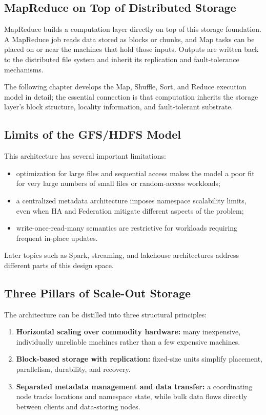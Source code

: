\documentclass[11pt,a4paper,oneside]{book}
\begin{document}
\subsection{MapReduce on Top of Distributed Storage}

MapReduce builds a computation layer directly on top of this storage foundation. A MapReduce job reads data stored as blocks or chunks, and Map tasks can be placed on or near the machines that hold those inputs. Outputs are written back to the distributed file system and inherit its replication and fault-tolerance mechanisms.

The following chapter develops the Map, Shuffle, Sort, and Reduce execution model in detail; the essential connection is that computation inherits the storage layer's block structure, locality information, and fault-tolerant substrate.

\subsection{Limits of the GFS/HDFS Model}

This architecture has several important limitations:

\begin{itemize}
    \item optimization for large files and sequential access makes the model a poor fit for very large numbers of small files or random-access workloads;
    \item a centralized metadata architecture imposes namespace scalability limits, even when HA and Federation mitigate different aspects of the problem;
    \item write-once-read-many semantics are restrictive for workloads requiring frequent in-place updates.
\end{itemize}

Later topics such as Spark, streaming, and lakehouse architectures address different parts of this design space.

\subsection{Three Pillars of Scale-Out Storage}

The architecture can be distilled into three structural principles:

\begin{enumerate}
    \item \textbf{Horizontal scaling over commodity hardware:} many inexpensive, individually unreliable machines rather than a few expensive machines.
    \item \textbf{Block-based storage with replication:} fixed-size units simplify placement, parallelism, durability, and recovery.
    \item \textbf{Separated metadata management and data transfer:} a coordinating node tracks locations and namespace state, while bulk data flows directly between clients and data-storing nodes.
\end{enumerate}
\end{document}
